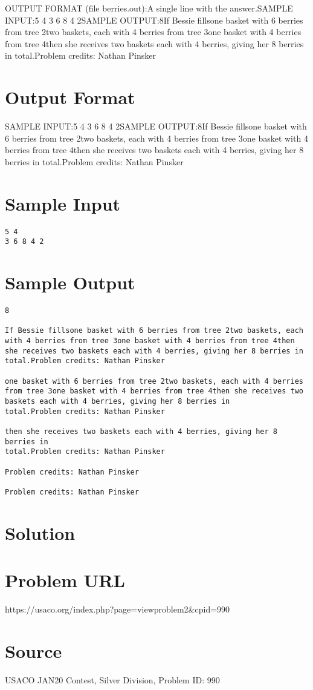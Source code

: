 \documentclass[12pt]{article}
\begin{document}
OUTPUT FORMAT (file berries.out):A single line with the answer.SAMPLE INPUT:5 4
3 6 8 4 2SAMPLE OUTPUT:8If Bessie fillsone basket with 6 berries from tree 2two baskets, each with 4 berries from tree 3one basket with 4 berries from tree 4then she receives two baskets each with 4 berries, giving her 8 berries in
total.Problem credits: Nathan Pinsker

\section*{Output Format}
SAMPLE INPUT:5 4
3 6 8 4 2SAMPLE OUTPUT:8If Bessie fillsone basket with 6 berries from tree 2two baskets, each with 4 berries from tree 3one basket with 4 berries from tree 4then she receives two baskets each with 4 berries, giving her 8 berries in
total.Problem credits: Nathan Pinsker

\section*{Sample Input}
\begin{verbatim}
5 4
3 6 8 4 2
\end{verbatim}

\section*{Sample Output}
\begin{verbatim}
8

If Bessie fillsone basket with 6 berries from tree 2two baskets, each with 4 berries from tree 3one basket with 4 berries from tree 4then she receives two baskets each with 4 berries, giving her 8 berries in
total.Problem credits: Nathan Pinsker

one basket with 6 berries from tree 2two baskets, each with 4 berries from tree 3one basket with 4 berries from tree 4then she receives two baskets each with 4 berries, giving her 8 berries in
total.Problem credits: Nathan Pinsker

then she receives two baskets each with 4 berries, giving her 8 berries in
total.Problem credits: Nathan Pinsker

Problem credits: Nathan Pinsker

Problem credits: Nathan Pinsker
\end{verbatim}

\section*{Solution}


\section*{Problem URL}
https://usaco.org/index.php?page=viewproblem2&cpid=990

\section*{Source}
USACO JAN20 Contest, Silver Division, Problem ID: 990
\end{document}
